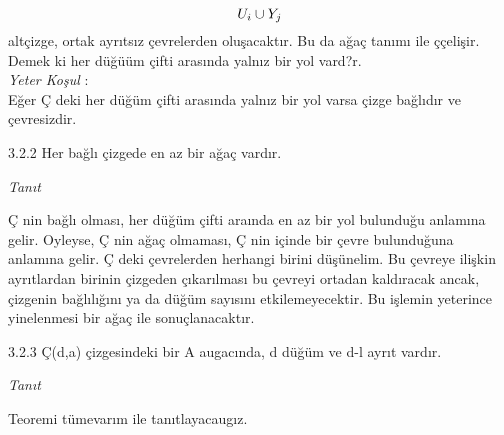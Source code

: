 \documentclass[11pt]{amsbook}
\begin{document}


\begin{equation}
U_{i} \cup Y_{j} \\
\end{equation}
alt\c{c}izge, ortak ayr{\i}ts{\i}z \c{c}evrelerden olu\c{s}acakt{\i}r. Bu da a\u{g}a\c{c} tan{\i}m{\i}
ile \c{c}\c{c}eli\c{s}ir. Demek ki her d\"{u}\u{g}\"{u}\"{u}m \c{c}ifti aras{\i}nda yaln{\i}z bir yol vard?r. \\

\textit{Yeter Ko\c{s}ul} : \\
E\u{g}er \c{C} deki her d\"{u}\u{g}\"{u}m \c{c}ifti aras{\i}nda yaln{\i}z bir yol varsa \c{c}izge ba\u{g}l{\i}d{\i}r 
ve \c{c}evresizdir.
\begin{theorem}{3.2.2}
Her ba\u{g}l{\i} \c{c}izgede en az bir a\u{g}a\c{c} vard{\i}r.
\end{theorem}

\textit{Tan{\i}t}

\c{C} nin ba\u{g}l{\i} olmas{\i}, her d\"{u}\u{g}\"{u}m \c{c}ifti ara{\i}nda en az bir yol bulundu\u{g}u anlam{\i}na gelir. Oyleyse, \c{C} nin a\u{g}a\c{c} olmamas{\i}, \c{C} nin i\c{c}inde bir \c{c}evre bulundu\u{g}una anlam{\i}na gelir. \c{C} deki \c{c}evrelerden 
herhangi birini d\"{u}\c{s}\"{u}nelim. Bu \c{c}evreye ili\c{s}kin ayr{\i}tlardan birinin 
\c{c}izgeden \c{c}{\i}kar{\i}lmas{\i} bu \c{c}evreyi ortadan kald{\i}racak ancak, \c{c}izgenin ba\u{g}l{\i}l{\i}\u{g}{\i}n{\i}
ya da d\"{u}\u{g}\"{u}m say{\i}s{\i}n{\i} etkilemeyecektir. Bu i\c{s}lemin yeterince yinelenmesi bir a\u{g}a\c{c}
ile sonu\c{c}lanacakt{\i}r.
\begin{theorem}{3.2.3}
\c{C}(d,a) \c{c}izgesindeki bir A au{g}ac{\i}nda, d d\"{u}\u{g}\"{u}m ve d-l ayr{\i}t vard{\i}r.
\end{theorem}

\textit{Tan{\i}t}

Teoremi t\"{u}mevar{\i}m ile tan{\i}tlayacau{g}{\i}z.
\end{document}
